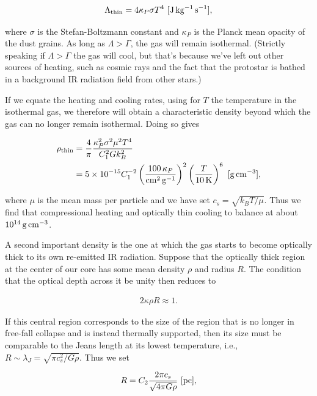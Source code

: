 \documentclass[a4paper,10pt]{article}
\begin{document}
\begin{align*}
    \Lambda_{\rm thin} = 4\kappa_P\sigma T^4 ~ [{\rm J\,kg^{-1}\,s^{-1}}],
\end{align*}

{\noindent}where $\sigma$ is the Stefan-Boltzmann constant and $\kappa_P$ is the Planck mean opacity of the dust grains. As long as $\Lambda>\Gamma$, the gas will remain isothermal. (Strictly speaking if $\Lambda>\Gamma$ the gas will cool, but that's because we've left out other sources of heating, such as cosmic rays and the fact that the protostar is bathed in a background IR radiation field from other stars.)

{\noindent}If we equate the heating and cooling rates, using for $T$ the temperature in the isothermal gas, we therefore will obtain a characteristic density beyond which the gas can no longer remain isothermal. Doing so gives

\begin{align*}
    \rho_{\rm thin} &= \frac{4}{\pi} \frac{\kappa_P^2\sigma^2\mu^2T^4}{C_1^2Gk_B^2} \\
    &= 5\times10^{-15} C_1^{-2} \left(\frac{100\,\kappa_P}{{\rm cm^2\,g^{-1}}}\right)^2 \left(\frac{T}{10\,{\rm K}}\right)^6 ~ [{\rm g\,cm^{-3}}],
\end{align*}

{\noindent}where $\mu$ is the mean mass per particle and we have set $c_s=\sqrt{k_BT/\mu}$. Thus we find that compressional heating and optically thin cooling to balance at about $10^{14}\,{\rm g\,cm^{-3}}$.

{\noindent}A second important density is the one at which the gas starts to become optically thick to its own re-emitted IR radiation. Suppose that the optically thick region at the center of our core has some mean density $\rho$ and radius $R$. The condition that the optical depth across it be unity then reduces to

\begin{align*}
    2\kappa\rho R \approx 1.
\end{align*}

{\noindent}If this central region corresponds to the size of the region that is no longer in free-fall collapse and is instead thermally supported, then its size must be comparable to the Jeans length at its lowest temperature, i.e., $R\sim\lambda_J = \sqrt{\pi c_s^2/G\rho}$. Thus we set

\begin{align*}
    R = C_2 \frac{2\pi c_s}{\sqrt{4\pi G\rho}} ~ [{\rm pc}],
\end{align*}
\end{document}
